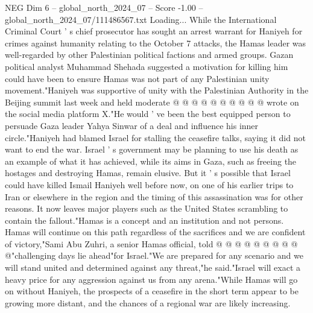 \begin{textsample}{NEG Dim 6 – global\_north\_2024\_07 – Score -1.00 – global\_north\_2024\_07/111486567.txt}
Loading...
While the International Criminal Court ' s chief prosecutor has sought an arrest warrant for Haniyeh for crimes against humanity relating to the October 7 attacks, the Hamas leader was well-regarded by other Palestinian political factions and armed groups.
Gazan political analyst Muhammad Shehada suggested a motivation for killing him could have been to ensure Hamas was not part of any Palestinian unity movement."Haniyeh was supportive of unity with the Palestinian Authority in the Beijing summit last week and held moderate @ @ @ @ @ @ @ @ @ @ wrote on the social media platform X."He would ' ve been the best equipped person to persuade Gaza leader Yahya Sinwar of a deal and influence his inner circle."Haniyeh had blamed Israel for stalling the ceasefire talks, saying it did not want to end the war.
Israel ' s government may be planning to use his death as an example of what it has achieved, while its aims in Gaza, such as freeing the hostages and destroying Hamas, remain elusive.
But it ' s possible that Israel could have killed Ismail Haniyeh well before now, on one of his earlier trips to Iran or elsewhere in the region and the timing of this assassination was for other reasons.
It now leaves major players such as the United States scrambling to contain the fallout."Hamas is a concept and an institution and not persons.
Hamas will continue on this path regardless of the sacrifices and we are confident of victory,"Sami Abu Zuhri, a senior Hamas official, told @ @ @ @ @ @ @ @ @ @"challenging days lie ahead"for Israel."We are prepared for any scenario and we will stand united and determined against any threat,"he said."Israel will exact a heavy price for any aggression against us from any arena."While Hamas will go on without Haniyeh, the prospects of a ceasefire in the short term appear to be growing more distant, and the chances of a regional war are likely increasing.

\end{textsample}
